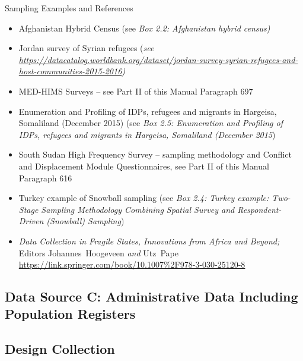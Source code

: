 \documentclass[
]{article}
\begin{document}
Sampling Examples and References

\begin{itemize}
\item
  Afghanistan Hybrid Census (see \emph{Box 2.2: Afghanistan hybrid census)}
\item
  Jordan survey of Syrian refugees (\emph{see
  \url{https://datacatalog.worldbank.org/dataset/jordan-survey-syrian-refugees-and-host-communities-2015-2016})}
\item
  MED-HIMS Surveys -- see Part II of this Manual Paragraph 697
\item
  Enumeration and Profiling of IDPs, refugees and migrants in
  Hargeisa, Somaliland (December 2015) (see \emph{Box 2.5: Enumeration and
  Profiling of IDPs, refugees and migrants in Hargeisa, Somaliland
  (December 2015})
\item
  South Sudan High Frequency Survey -- sampling methodology and
  Conflict and Displacement Module Questionnaires, see Part II of this
  Manual Paragraph 616
\item
  Turkey example of Snowball sampling (see \emph{Box 2.4: Turkey example:
  Two-Stage Sampling Methodology Combining Spatial Survey and
  Respondent-Driven (Snowball) Sampling})
\item
  \emph{Data Collection in Fragile States, Innovations from Africa and
  Beyond;} Editors Johannes~Hoogeveen \emph{and} Utz~Pape
  \url{https://link.springer.com/book/10.1007\%2F978-3-030-25120-8}
\end{itemize}

\hypertarget{data-source-c-administrative-data-including-population-registers-1}{%
\subsection{Data Source C: Administrative Data Including Population Registers}\label{data-source-c-administrative-data-including-population-registers-1}}

\hypertarget{design-collection-6}{%
\subsection{Design Collection}\label{design-collection-6}}
\end{document}
